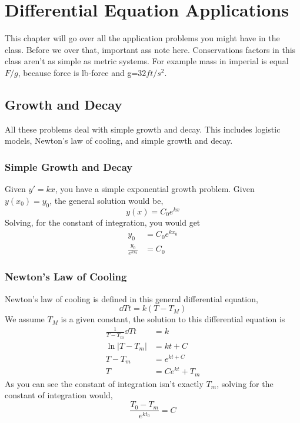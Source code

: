 \chapter{Differential Equation Applications}
This chapter will go over all the application problems you might have in the class. Before we over that, important ass note here. Conservations factors in this class aren't as simple as metric systems. For example mass in imperial is equal $F/g$, because force is lb-force and g=$32ft/s^2$.

\section{Growth and Decay}
All these problems deal with simple growth and decay. This includes logistic models, Newton's law of cooling, and simple growth and decay. 
\subsection{Simple Growth and Decay}
Given $y' = kx$, you have a simple exponential growth problem. Given $y(x_0) = y_0$, the general solution would be, 
\begin{equation*}
	y(x) = C_0e^{kx}
\end{equation*}
Solving, for the constant of integration, you would get 
\begin{align*}
	y_0 &= C_0e^{kx_0} \\ 
	\frac{y_0}{e^{kx_0}} &= C_0 	
\end{align*}
\subsection{Newton's Law of Cooling}
Newton's law of cooling is defined in this general differential equation, 
\begin{equation*}
	\dd{T}{t} = k(T-T_M)
\end{equation*}
We assume $T_M$ is a given constant, the solution to this differential equation is 
\begin{align*}
	\frac{1}{T-T_m} \dd{T}{t} &= k \\ 
	\ln|T-T_m|  &= kt+C \\ 
	T - T_m &= e^{kt+C} \\ 
	T &= Ce^{kt} + T_m  
\end{align*}
As you can see the constant of integration isn't exactly $T_m$, solving for the constant of integration would,
\begin{equation*}
	\frac{T_0-T_m}{e^{kt_0}} = C
\end{equation*}
